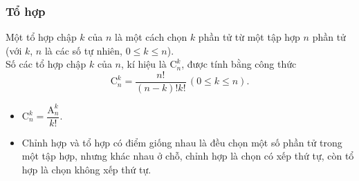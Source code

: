 \subsubsection{Tổ hợp}
\begin{dn}{}
	Một tổ hợp chập $k$ của $n$ là một cách chọn $k$ phần tử từ một tập hợp $n$ phần tử (với $k$, $n$ là các số tự nhiên, $0 \leq k \leq n$).\\
	Số các tổ hợp chập $k$ của $n$, kí hiệu là $\mathrm{C}_n^k$, được tính bằng công thức
	$$\mathrm{C}_n^k=\dfrac{n!}{(n-k)!k!}\,(0 \leq k \leq n).$$
\end{dn}

\begin{note}
	\begin{itemize}
		\item $\mathrm{C}_{n}^{k}=\dfrac{\mathrm{A}_{n}^{k}}{k!}$.
		\item Chỉnh hợp và tổ hợp có điểm giống nhau là đều chọn một số phần tử trong một tập hợp, nhưng khác nhau ở chỗ, chỉnh hợp là chọn có xếp thứ tự, còn tổ hợp là chọn không xếp thứ tự.
	\end{itemize}
\end{note}

